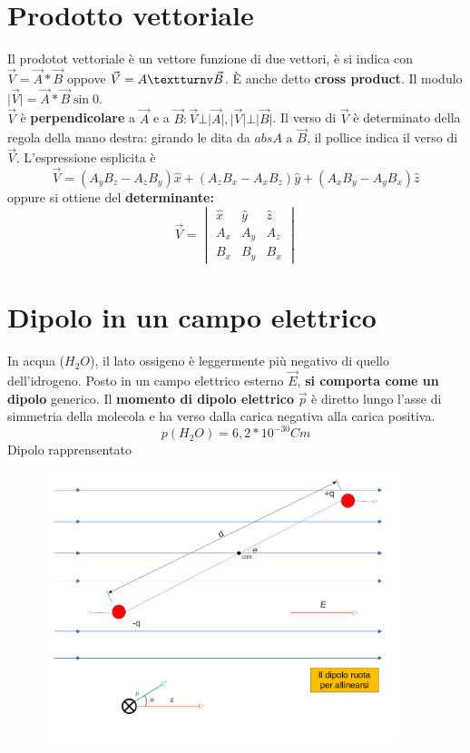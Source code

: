 \documentclass{book}
\newcommand{\abs}[1]{\lvert#1\rvert}
\begin{document}
\section{Prodotto vettoriale}
Il prodotot vettoriale è un vettore funzione di due vettori, è si indica con $\vec{V}=\vec{A}*\vec{B}$ oppove
$\vec{V}=A\textturnv \vec{B}$. È anche detto \textbf{cross product}. Il modulo
$\abs{\vec{V}}=\vec{A}*\vec{B}\sin0$.\\
$\vec{V}$ è \textbf{perpendicolare} a $\vec{A}$ e a
$\vec{B}:\vec{V}\bot \abs{\vec{A}},\abs{\vec{V}}\bot\abs{\vec{B}}$. Il verso di $\vec{V}$ è determinato della
regola della mano destra: girando le dita da $abs{A} \text { a } \vec{B}$, il pollice indica il verso di $\vec{V}$. L'espressione esplicita è
\begin{equation}
  \vec{V}=(A_yB_z-A_zB_y)\hat{x}+(A_zB_x-A_xB_z)\hat{y}+(A_xB_y-A_yB_x)\hat{z}
\end{equation}
oppure si ottiene del \textbf{determinante:}
\begin{equation}
  \vec{V}=\begin{vmatrix}
            \hat{x}&\hat{y}&\hat{z}\\
            A_x&A_y&A_z\\
            B_x&B_y&B_x
          \end{vmatrix}
\end{equation}
\section{Dipolo in un campo elettrico}
In acqua ($H_2O$), il lato ossigeno è leggermente più negativo di quello dell'idrogeno. Posto in un campo
elettrico esterno $\vec{E}$, \textbf{si comporta come un dipolo} generico. Il \textbf{momento di dipolo elettrico} $\vec{p}$ è diretto lungo l'asse di simmetria della molecola e ha verso dalla carica negativa alla carica positiva.
\begin{equation}
  p(H_2O)=6,2*10^{-30}Cm
\end{equation}
Dipolo rapprensentato
\begin{figure}[!h]
 	\centering
	\includegraphics[height=8cm]{img/grafuci del dipolo elettrico.png}
\end{figure}
\end{document}
